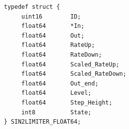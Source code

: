 \begin{lstlisting}
typedef struct {
     uint16        ID;
     float64       *In;
     float64       Out;
     float64       RateUp;
     float64       RateDown;
     float64       Scaled_RateUp;
     float64       Scaled_RateDown;
     float64       Out_end;
     float64       Level;
     float64       Step_Height;
     int8          State;
} SIN2LIMITER_FLOAT64;
\end{lstlisting}

\ifdefined \AddTestReports
{}
\fi
